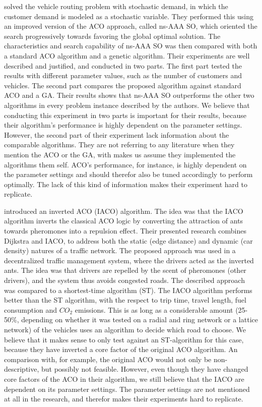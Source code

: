 \citet{tripathi09} solved the vehicle routing problem with stochastic demand, in which the customer demand is modeled as a stochastic variable. They performed this using an improved version of the ACO approach, called ns-AAA SO, which oriented the search progressively towards favoring the global optimal solution. The characteristics and search capability of ns-AAA SO was then compared with both a standard ACO algorithm and a genetic algorithm. Their experiments are well described and justified, and conducted in two parts. The first part tested the results with different parameter values, such as the number of customers and vehicles. The second part compares the proposed algorithm against standard ACO and a GA. Their results shows that ns-AAA SO outperforms the other two algorithms in every problem instance described by the authors. We believe that conducting this experiment in two parts is important for their results, because their algorithm's performance is highly dependent on the parameter settings. However, the second part of their experiment lack information about the comparable algorithms. They are not referring to any literature when they mention the ACO or the GA, with makes us assume they implemented the algorithms them self. ACO's performance, for instance, is highly dependent on the parameter settings and should therefor also be tuned accordingly to perform optimally. The lack of this kind of information makes their experiment hard to replicate. 

\citet{dias14} introduced an inverted ACO (IACO) algorithm. The idea was that the IACO algorithm inverts the classical ACO logic by converting the attraction of ants towards pheromones into a repulsion effect. Their presented research combines Dijkstra and IACO, to address both the static (edge distance) and dynamic (car density) natures of a traffic network. The proposed approach was used in a decentralized traffic management system, where the drivers acted as the inverted ants. The idea was that drivers are repelled by the scent of pheromones (other drivers), and the system thus avoids congested roads. The described approach was compared to a shortest-time algorithm (ST). The IACO algorithm performs better than the ST algorithm, with the respect to trip time, travel length, fuel consumption and $CO_2$ emissions. This is as long as a considerable amount (25-50\%, depending on whether it was tested on a radial and ring network or a lattice network) of the vehicles uses an algorithm to decide which road to choose. We believe that it makes sense to only test against an ST-algorithm for this case, because they have inverted a core factor of the original ACO algorithm. An comparison with, for example, the original ACO would not only be non-descriptive, but possibly not feasible. However, even though they have changed core factors of the ACO in their algorithm, we still believe that the IACO are dependent on its parameter settings. The parameter settings are not mentioned at all in the research, and therefor makes their experiments hard to replicate. 

